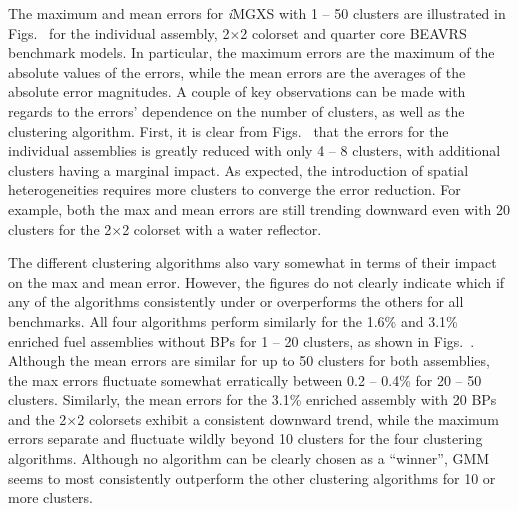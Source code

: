 The maximum and mean errors for \textit{i}\ac{MGXS} with 1 -- 50 clusters are illustrated in Figs.~ for the individual assembly, 2$\times$2 colorset and quarter core \ac{BEAVRS} benchmark models. In particular, the maximum errors are the maximum of the absolute values of the errors, while the mean errors are the averages of the absolute error magnitudes. A couple of key observations can be made with regards to the errors' dependence on the number of clusters, as well as the clustering algorithm. First, it is clear from Figs.~ that the errors for the individual assemblies is greatly reduced with only 4 -- 8 clusters, with additional clusters having a marginal impact. As expected, the introduction of spatial heterogeneities requires more clusters to converge the error reduction. For example, both the max and mean errors are still trending downward even with 20 clusters for the 2$\times$2 colorset with a water reflector.


The different clustering algorithms also vary somewhat in terms of their impact on the max and mean error. However, the figures do not clearly indicate which if any of the algorithms consistently under or overperforms the others for all benchmarks. All four algorithms perform similarly for the 1.6\% and 3.1\% enriched fuel assemblies without \acp{BP} for 1 -- 20 clusters, as shown in Figs.~. Although the mean errors are similar for up to 50 clusters for both assemblies, the max errors fluctuate somewhat erratically between 0.2 -- 0.4\% for 20 -- 50 clusters. Similarly, the mean errors for the 3.1\% enriched assembly with 20 \acp{BP} and the 2$\times$2 colorsets exhibit a consistent downward trend, while the maximum errors separate and fluctuate wildly beyond 10 clusters for the four clustering algorithms. Although no algorithm can be clearly chosen as a ``winner'', \ac{GMM} seems to most consistently outperform the other clustering algorithms for 10 or more clusters. 

